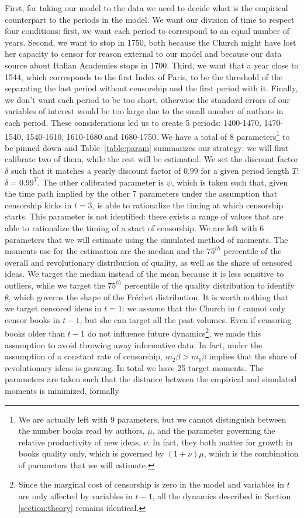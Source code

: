 \documentclass[12pt]{article}
\begin{document}
First, for taking our model to the data we need to decide what is the empirical counterpart to the periods in the model. We want our division of time to respect four conditions: first, we want each period to correspond to an equal number of years. Second, we want to stop in 1750, both because the Church might have lost her capacity to censor for reason external to our model and because our data source about Italian Academies stops in 1700. Third, we want that a year close to 1544, which corresponds to the first Index of Paris, to be the threshold of the separating the last period without censorship and the first period with it. Finally, we don't want each period to be too short, otherwise the standard errors of our variables of interest would be too large due to the small number of authors in each period. These considerations led us to create 5 periods: 1400-1470, 1470-1540, 1540-1610, 1610-1680 and 1680-1750. We have a total of 8 parameters\footnote{We are actually left with 9 parameters, but we cannot distinguish between the number books read by authors, $\mu$, and the parameter governing the relative productivity of new ideas, $\nu$. In fact, they both matter for growth in books quality only, which is governed by $(1+\nu)\mu$, which is the combination of parameters that we will estimate.} to be pinned down and Table~\ref{table:param} summarizes our strategy: we will first calibrate two of them, while the rest will be estimated. We set the discount factor $\delta$ such that it matches a yearly discount factor of $0.99$ for a given period length $T$: $\delta=0.99^{T}$. The other calibrated parameter is $\psi$, which is taken such that, given the time path implied by the other 7 parameters under the assumption that censorship kicks in  $t=3$, is able to rationalize the timing at which censorship starts. This parameter is not identified: there exists a range of values that are able to rationalize the timing of a start of  censorship.
We are left with 6 parameters that we will estimate using the simulated method of moments. The moments use for the estimation are the median and the $75^{th}$ percentile of the overall and revolutionary distribution of quality, as well as the share of censored ideas. We target the median instead of the mean because it is less sensitive to outliers, while we target the $75^{th}$ percentile of the quality distribution to identify $\theta$, which governs the shape of the Fréchet distribution. It is worth nothing that we target censored ideas in $t=1$: we assume that the Church in $t$ cannot only censor books in $t-1$, but she can target all the past volumes. Even if censoring books older than $t-1$ do not influence future dynamics\footnote{Since the marginal cost of censorship is zero in the model and variables in $t$ are only affected by variables in $t-1$, all the dynamics described in Section \ref{section:theory} remains identical.}, we made this assumption to avoid throwing away informative data. In fact, under the assumption of a constant rate of censorship, $m_2\overline{\beta}>m_1\overline{\beta}$ implies that the share of revolutionary ideas is growing. In total we have 25 target moments. The parameters are taken such that the distance between the empirical and simulated moments is minimized, formally
\end{document}
